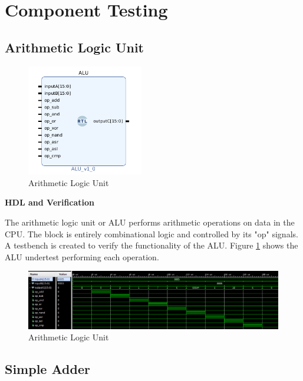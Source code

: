 \documentclass{article}
\newcommand{\stitle}{HDL and Verification}
\begin{document}
\section{Component Testing}
\label{compd}
\begin{par}
	
	\subsection{Arithmetic Logic Unit}
	
	\begin{figure}[H]
		\centering
		\includegraphics[width=2in]{img/alu.png}
		\caption{Arithmetic Logic Unit}
	\end{figure}

	\textbf{\stitle}
	\begin{par}
		The arithmetic logic unit or ALU performs arithmetic operations on data in the CPU. The block is entirely combinational logic and controlled by its "op" signals. A testbench is created to verify the functionality of the ALU. Figure \ref{fig:alutbfig} shows the ALU undertest performing each operation. 
	\end{par}

	\begin{figure}[H]
		\centering
		\includegraphics[width=7in]{img/alu_tb.png}
		\caption{Arithmetic Logic Unit}
		\label{fig:alutbfig}
	\end{figure}

	\newpage

	\subsection{Simple Adder}
	

\end{par}
\end{document}
